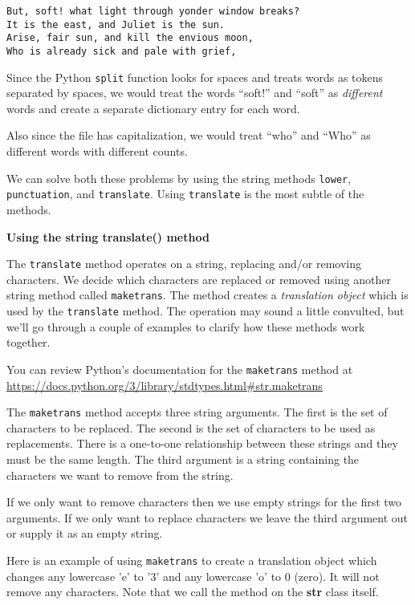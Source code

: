 \beforeverb
\begin{verbatim}
But, soft! what light through yonder window breaks?
It is the east, and Juliet is the sun.
Arise, fair sun, and kill the envious moon,
Who is already sick and pale with grief,
\end{verbatim}
\afterverb
%
Since the Python {\tt split} function looks for spaces and
treats words as tokens separated by spaces, we would treat the
words ``soft!'' and ``soft'' as \emph{different} words and create
a separate dictionary entry for each word.

Also since the file has capitalization, we would treat
``who'' and ``Who'' as different words with different 
counts.

We can solve both these problems by using the string
methods {\tt lower}, {\tt punctuation}, and {\tt translate}. Using {\tt translate} is the most subtle of the methods.  


{\bf Using the string translate() method}

The {\tt translate} method operates on a string, replacing and/or removing characters. We decide which characters are replaced or removed using another string method called {\tt maketrans}. The method creates a {\em translation object} which is used by the {\tt translate} method. The operation may sound a little convulted, but we'll go through a couple of examples to clarify how these methods work together.

You can review Python's documentation for the {\tt maketrans} method at 
\url{https://docs.python.org/3/library/stdtypes.html#str.maketrans}

The {\tt maketrans} method accepts three string arguments. The first is the set of characters to be replaced. The second is the set of characters to be used as replacements. There is a one-to-one relationship between these strings and they must be the same length. The third argument is a string containing the characters we want to remove from the string.

If we only want to remove characters then we use empty strings for the first two arguments. If we only want to replace characters we leave the third argument out or supply it as an empty string.

Here is an example of using {\tt maketrans} to create a translation object which changes any lowercase 'e' to '3' and any lowercase 'o' to 0 (zero). It will not remove any characters. Note that we call the method on the {\bf str} class itself.


